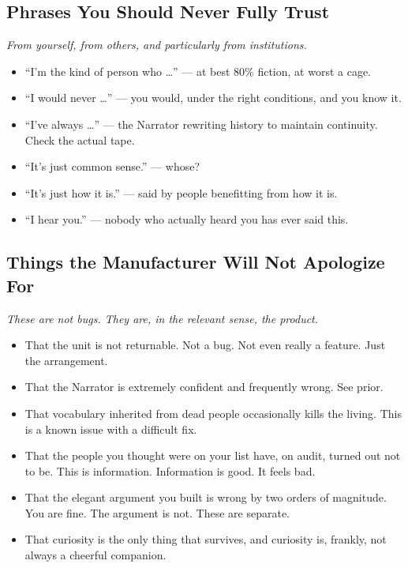 \documentclass[11pt, letterpaper]{article}
\begin{document}
\subsection*{Phrases You Should Never Fully Trust}

\vspace{0.2em}
\textit{From yourself, from others, and particularly from institutions.}

\begin{itemize}[leftmargin=1.5em, itemsep=3pt]
  \item ``I'm the kind of person who \ldots'' --- at best 80\% fiction, at worst a cage.
  \item ``I would never \ldots'' --- you would, under the right conditions, and you know it.
  \item ``I've always \ldots'' --- the Narrator rewriting history to maintain continuity. Check the actual tape.
  \item ``It's just common sense.'' --- whose?
  \item ``It's just how it is.'' --- said by people benefitting from how it is.
  \item ``I hear you.'' --- nobody who actually heard you has ever said this.
\end{itemize}

\subsection*{Things the Manufacturer Will Not Apologize For}

\vspace{0.2em}
\textit{These are not bugs. They are, in the relevant sense, the product.}

\begin{itemize}[leftmargin=1.5em, itemsep=3pt]
  \item That the unit is not returnable. Not a bug. Not even really a feature. Just the arrangement.
  \item That the Narrator is extremely confident and frequently wrong. See prior.
  \item That vocabulary inherited from dead people occasionally kills the living. This is a known issue with a difficult fix.
  \item That the people you thought were on your list have, on audit, turned out not to be. This is information. Information is good. It feels bad.
  \item That the elegant argument you built is wrong by two orders of magnitude. You are fine. The argument is not. These are separate.
  \item That curiosity is the only thing that survives, and curiosity is, frankly, not always a cheerful companion.
\end{itemize}
\end{document}
